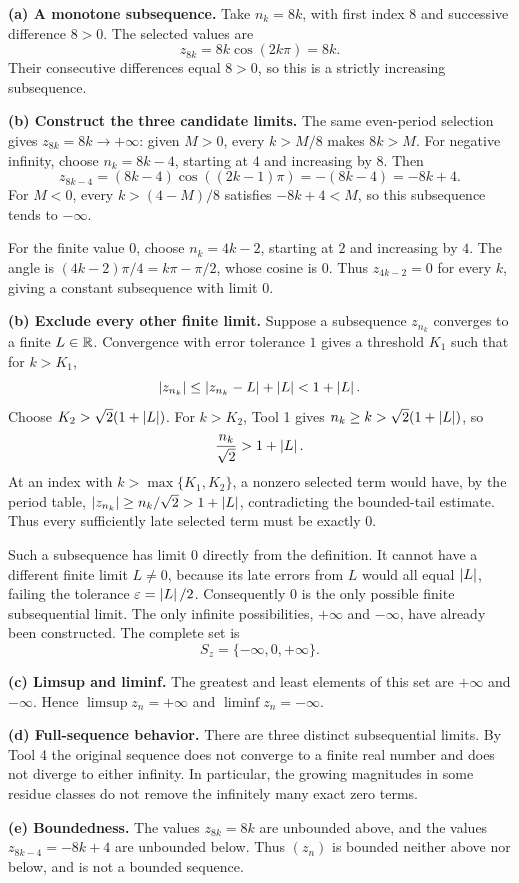 \textbf{(a) A monotone subsequence.}
Take $n_k=8k$, with first index $8$ and successive difference
$8>0$. The selected values are
\[
 z_{8k}=8k\cos(2k\pi)=8k.
\]
Their consecutive differences equal $8>0$, so this is a
strictly increasing subsequence.

\textbf{(b) Construct the three candidate limits.}
The same even-period selection gives $z_{8k}=8k\to+\infty$:
given $M>0$, every $k>M/8$ makes $8k>M$.
For negative infinity, choose $n_k=8k-4$, starting at $4$
and increasing by $8$. Then
\[
 z_{8k-4}=(8k-4)\cos((2k-1)\pi)=-(8k-4)=-8k+4.
\]
For $M<0$, every $k>(4-M)/8$ satisfies $-8k+4<M$,
so this subsequence tends to $-\infty$.

For the finite value $0$, choose $n_k=4k-2$, starting at
$2$ and increasing by $4$. The angle is
$(4k-2)\pi/4=k\pi-\pi/2$, whose cosine is $0$.
Thus $z_{4k-2}=0$ for every $k$, giving a constant
subsequence with limit $0$.

\textbf{(b) Exclude every other finite limit.}
Suppose a subsequence $z_{n_k}$ converges to a finite
$L\in\mathbb{R}$. Convergence with error tolerance $1$ gives a
threshold $K_1$ such that for $k>K_1$,
\[
 \left|z_{n_k}\right|
 \leq\left|z_{n_k}-L\right|+\left|L\right|<1+\left|L\right|.
\]
Choose $K_2>\sqrt2(1+\left|L\right|)$. For $k>K_2$, Tool 1
gives $n_k\geq k>\sqrt2(1+\left|L\right|)$, so
\[
 \frac{n_k}{\sqrt2}>1+\left|L\right|.
\]
At an index with $k>\max\{K_1,K_2\}$, a nonzero selected
term would have, by the period table,
$\left|z_{n_k}\right|\geq n_k/\sqrt2>1+\left|L\right|$, contradicting
the bounded-tail estimate. Thus every sufficiently late
selected term must be exactly $0$.

Such a subsequence has limit $0$ directly from the definition.
It cannot have a different finite limit $L\ne0$, because
its late errors from $L$ would all equal $\left|L\right|$, failing
the tolerance $\varepsilon=\left|L\right|/2$.
Consequently $0$ is the only possible finite subsequential
limit. The only infinite possibilities, $+\infty$ and
$-\infty$, have already been constructed. The complete set is
\[
 S_z=\{-\infty,0,+\infty\}.
\]

\textbf{(c) Limsup and liminf.}
The greatest and least elements of this set are
$+\infty$ and $-\infty$. Hence
$\limsup z_n=+\infty$ and $\liminf z_n=-\infty$.

\textbf{(d) Full-sequence behavior.}
There are three distinct subsequential limits. By Tool 4
the original sequence does not converge to a finite real
number and does not diverge to either infinity.
In particular, the growing magnitudes in some residue classes
do not remove the infinitely many exact zero terms.

\textbf{(e) Boundedness.}
The values $z_{8k}=8k$ are unbounded above, and the values
$z_{8k-4}=-8k+4$ are unbounded below. Thus $(z_n)$ is
bounded neither above nor below, and is not a bounded sequence.

